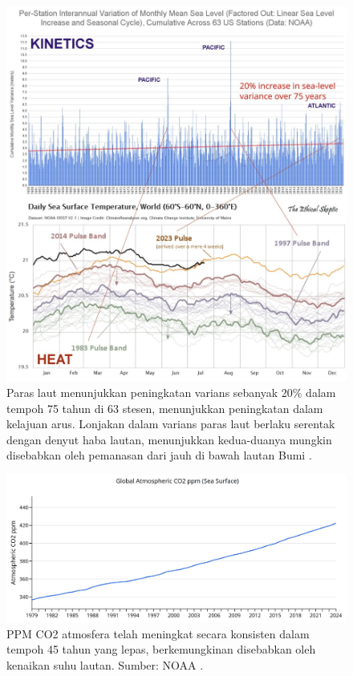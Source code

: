 \documentclass[10pt,twocolumn,letterpaper]{article}
\begin{document}
\begin{figure}[t]
\begin{center}
\includegraphics[width=1\textwidth]{sealevel.jpeg}
\end{center}
   \caption{Paras laut menunjukkan peningkatan varians sebanyak 20\% dalam tempoh 75 tahun di 63 stesen, menunjukkan peningkatan dalam kelajuan arus. Lonjakan dalam varians paras laut berlaku serentak dengan denyut haba lautan, menunjukkan kedua-duanya mungkin disebabkan oleh pemanasan dari jauh di bawah lautan Bumi \cite{2,129}.}
\label{fig:22}
\end{figure}

\begin{figure}[t]
\begin{center}
\includegraphics[width=1\textwidth]{co2.jpg}
\end{center}
   \caption{PPM CO2 atmosfera telah meningkat secara konsisten dalam tempoh 45 tahun yang lepas, berkemungkinan disebabkan oleh kenaikan suhu lautan. Sumber: NOAA \cite{148,129}.}
\label{fig:23}
\end{figure}
\end{document}

